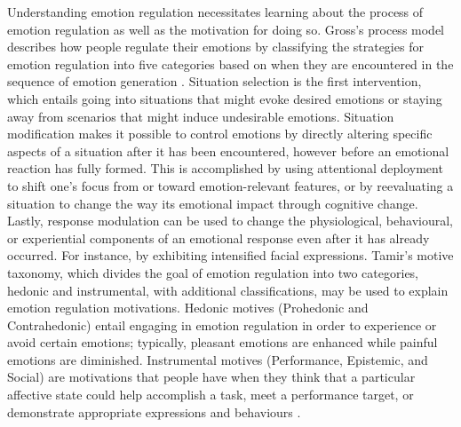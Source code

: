 \documentclass[lettersize,journal]{IEEEtran}
\begin{document}
Understanding emotion regulation necessitates learning about the process of emotion regulation as well as the motivation for doing so. Gross's process model describes how people regulate their emotions by classifying the strategies for emotion regulation into five categories based on when they are encountered in the sequence of emotion generation \cite{wadley2020digital}. Situation selection is the first intervention, which entails going into situations that might evoke desired emotions or staying away from scenarios that might induce undesirable emotions. Situation modification makes it possible to control emotions by directly altering specific aspects of a situation after it has been encountered, however before an emotional reaction has fully formed. This is accomplished by using attentional deployment to shift one's focus from or toward emotion-relevant features, or by reevaluating a situation to change the way its emotional impact through cognitive change. Lastly, response modulation can be used to change the physiological, behavioural, or experiential components of an emotional response even after it has already occurred. For instance, by exhibiting intensified facial expressions. Tamir's motive taxonomy, which divides the goal of emotion regulation into two categories, hedonic and instrumental, with additional classifications, may be used to explain emotion regulation motivations. Hedonic motives (Prohedonic and Contrahedonic) entail engaging in emotion regulation in order to experience or avoid certain emotions; typically, pleasant emotions are enhanced while painful emotions are diminished. Instrumental motives (Performance, Epistemic, and Social) are motivations that people have when they think that a particular affective state could help accomplish a task, meet a performance target, or demonstrate appropriate expressions and behaviours \cite{wadley2020digital}.
\end{document}
